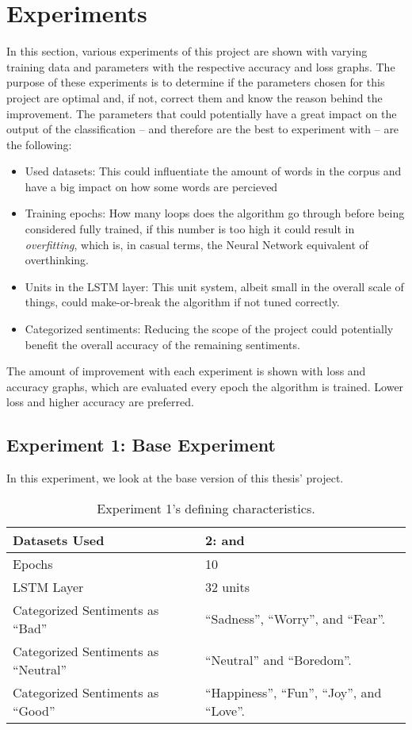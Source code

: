 \section{Experiments}
In this section, various experiments of this project are shown with varying training data and parameters with the respective accuracy and loss graphs.
The purpose of these experiments is to determine if the parameters chosen for this project are optimal and, if not, correct them and know the reason behind the improvement.
The parameters that could potentially have a great impact on the output of the classification -- and therefore are the best to experiment with -- are the following:
\begin{itemize}
	\item Used datasets: This could influentiate the amount of words in the corpus and have a big impact on how some words are percieved
	\item Training epochs: How many loops does the algorithm go through before being considered fully trained, if this number is too high it could result in \textit{overfitting}, which is, in casual terms, the Neural Network equivalent of overthinking.
	\item Units in the LSTM layer: This unit system, albeit small in the overall scale of things, could make-or-break the algorithm if not tuned correctly.
	\item Categorized sentiments: Reducing the scope of the project could potentially benefit the overall accuracy of the remaining sentiments.
\end{itemize}
The amount of improvement with each experiment is shown with loss and accuracy graphs, which are evaluated every epoch the algorithm is trained. Lower loss and higher accuracy are preferred.
\subsection{Experiment 1: Base Experiment}
\label{exp1}
In this experiment, we look at the base version of this thesis' project.
\begin{table}[!th]
	\caption{Experiment 1's defining characteristics.}
	\vspace{0.5cm}
	\centering
	\begin{tabular}[t]{|l|l|}
	\hline
		Datasets Used & 2: \citet{d1} and \citet{d2}
	\\ \hline
		Epochs & 10
	\\ \hline
		LSTM Layer & 32 units
	\\ \hline
		Categorized Sentiments as ``Bad'' & ``Sadness'', ``Worry'', and ``Fear''.
	\\ \hline	
		 Categorized Sentiments as ``Neutral'' & ``Neutral'' and ``Boredom''.
	\\ \hline	
		Categorized Sentiments as ``Good'' & ``Happiness'', ``Fun'', ``Joy'', and ``Love''.
	\\ \hline
	\end{tabular}
\end{table}

